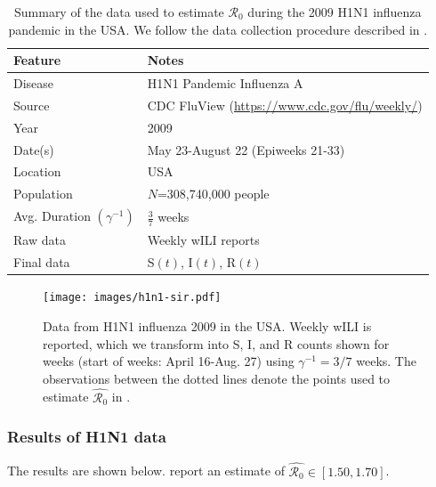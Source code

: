 \documentclass[12pt]{article}
\newcommand{\rr}{\ensuremath{\mathcal{R}_0}}
\begin{document}
\begin{table}[H]
\centering
\begin{tabular}{@{}ll@{}}
\toprule
Feature       & Notes                                                                   \\ \midrule
Disease       & H1N1 Pandemic Influenza A                                                 \\ 
Source        & CDC FluView (\url{https://www.cdc.gov/flu/weekly/})      \\
Year          & 2009                                                                    \\
Date(s)          & May 23-August 22 (Epiweeks 21-33)                                       \\
Location      & USA                                                                     \\
Population    & $N$=308,740,000 people                                                  \\
  Avg. Duration $\left ( \gamma^{-1}\right )$ & $\frac{3}{7}$ weeks\\
  Raw data & Weekly wILI reports\\
  Final data & S$(t)$, I$(t)$, R$(t)$ \\\bottomrule
\end{tabular}
\caption{Summary of the data used to estimate $\rr$ during the 2009 H1N1 influenza pandemic in the USA.  We follow the data collection procedure described in \cite{towers2009}.}
\label{tab:h1n1-data}
\end{table}

\begin{figure}[H]
  \centering
  \texttt{[image: images/h1n1-sir.pdf]}
  \caption{Data from H1N1 influenza 2009 in the USA.  Weekly wILI is reported, which we transform into S, I, and R counts shown for weeks (start of weeks: April 16-Aug. 27)  using $\gamma^{-1} = 3/7$ weeks.  The observations between the dotted lines denote the points used to estimate $\hat{\rr}$ in \cite{towers2009}.}
  \end{figure}
      

      \subsubsection{Results of H1N1 data}
      The results are shown below.  \cite{towers2009} report an estimate of $\hat{\rr} \in [1.50, 1.70]$.
\end{document}
